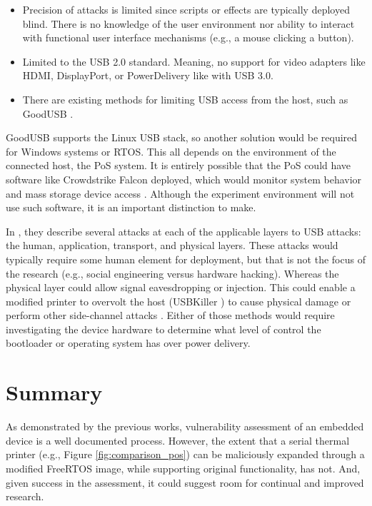 \begin{itemize}
  \item Precision of attacks is limited since scripts or effects are typically deployed blind. There is no knowledge of the user environment nor ability to interact with functional user interface mechanisms (e.g., a mouse clicking a button). 
  \item Limited to the USB 2.0 standard. Meaning, no support for video adapters like HDMI, DisplayPort, or PowerDelivery like with USB 3.0. 
  \item There are existing methods for limiting USB access from the host, such as GoodUSB \autocite{tianDefendingMaliciousUSB2015}.
\end{itemize}

GoodUSB supports the Linux USB stack, so another solution would be required for Windows systems or RTOS. This all depends on the environment of the connected host, the PoS system. It is entirely possible that the PoS could have software like Crowdstrike Falcon deployed, which would monitor system behavior and mass storage device access \autocite{backer2021sdn}. Although the experiment environment will not use such software, it is an important distinction to make.

In \autocite*{tianSoKPlugPray2018}, they describe several attacks at each of the applicable layers to USB attacks: the human, application, transport, and physical layers. These attacks would typically require some human element for deployment, but that is not the focus of the research (e.g., social engineering versus hardware hacking). Whereas the physical layer could allow signal eavesdropping or injection. This could enable a modified printer to overvolt the host (USBKiller \autocite{USBKillDevices}) to cause physical damage or perform other side-channel attacks \autocite*{sridharEMIIssuesUniversal2003}. Either of those methods would require investigating the device hardware to determine what level of control the bootloader or operating system has over power delivery.



\section{Summary} \label{introductionsummary}

As demonstrated by the previous works, vulnerability assessment of an embedded device is a well documented process. However, the extent that a serial thermal printer (e.g., Figure \ref{fig:comparison_pos}) can be maliciously expanded through a modified FreeRTOS image, while supporting original functionality, has not. And, given success in the assessment, it could suggest room for continual and improved research.